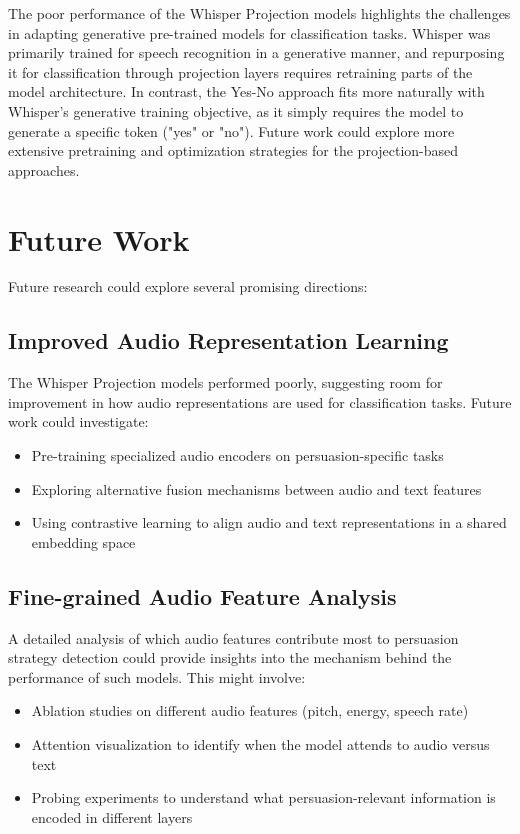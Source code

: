 \documentclass{article}
\begin{document}
The poor performance of the Whisper Projection models highlights the challenges in adapting generative pre-trained models for classification tasks. Whisper was primarily trained for speech recognition in a generative manner, and repurposing it for classification through projection layers requires retraining parts of the model architecture. In contrast, the Yes-No approach fits more naturally with Whisper's generative training objective, as it simply requires the model to generate a specific token ("yes" or "no"). Future work could explore more extensive pretraining and optimization strategies for the projection-based approaches.

\section{Future Work}
Future research could explore several promising directions:

\subsection{Improved Audio Representation Learning}
The Whisper Projection models performed poorly, suggesting room for improvement in how audio representations are used for classification tasks. Future work could investigate:
\begin{itemize}
    \item Pre-training specialized audio encoders on persuasion-specific tasks
    \item Exploring alternative fusion mechanisms between audio and text features
    \item Using contrastive learning to align audio and text representations in a shared embedding space
\end{itemize}

\subsection{Fine-grained Audio Feature Analysis}
A detailed analysis of which audio features contribute most to persuasion strategy detection could provide insights into the mechanism behind the performance of such models. This might involve:
\begin{itemize}
    \item Ablation studies on different audio features (pitch, energy, speech rate)
    \item Attention visualization to identify when the model attends to audio versus text
    \item Probing experiments to understand what persuasion-relevant information is encoded in different layers
\end{itemize}
\end{document}
